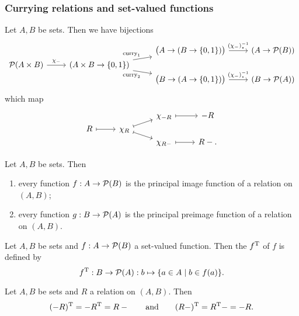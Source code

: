 \subsubsection{Currying relations and set-valued functions}

\begin{proposition} \label{principalImageEquivalence}
Let $A,B$ be sets. Then we have bijections
\[ \begin{tikzcd}[row sep=0]
{} & {} & \big(A\to (B\to \{0,1\}) \big) \ar[r, "{(\charFunc{-})^{-1}_\star}"] & (A\to \powerset(B)) \\
\powerset(A\times B) \ar[r, "{\charFunc{-}}"] & (A\times B \to \{0,1\}) \ar[ur, "\curry_1"] \ar[dr, swap, "\curry_2"] & {} & {} \\
{} & {} & \big(B\to (A\to \{0,1\}) \big) \ar[r, "{(\charFunc{-})^{-1}_\star}"] & (B\to \powerset(A))
\end{tikzcd} \]
which map
\[ \begin{tikzcd}[row sep=0]
{} & {} & \charFunc{-R} \ar[r, mapsto] & -R \\
R \ar[r, mapsto] & \charFunc{R} \ar[ur, mapsto] \ar[dr, mapsto] & {} & {} \\
{} & {} & \charFunc{R-} \ar[r, mapsto] & R-.
\end{tikzcd} \]
\end{proposition}
\begin{corollary}
Let $A,B$ be sets. Then
\begin{enumerate}
\item every function $f: A\to \operatorname{\mathcal{P}}(B)$ is the principal image function of a relation on $(A,B)$;
\item every function $g: B\to \operatorname{\mathcal{P}}(A)$ is the principal preimage function of a relation on $(A,B)$.
\end{enumerate}
\end{corollary}

\begin{definition}
Let $A,B$ be sets and $f: A\to \operatorname{\mathcal{P}}(B)$ a set-valued function. Then the  $f^{\mathrm{T}}$ of $f$ is defined by
\[ f^\transp: B\to \powerset(A): b\mapsto \setbuilder{a\in A}{b\in f(a)}. \]
\end{definition}

\begin{lemma}
Let $A,B$ be sets and $R$ a relation on $(A,B)$. Then
\[ (-R)^{\mathrm{T}} = -R^{\mathrm{T}} = R- \qquad\text{and}\qquad (R-)^{\mathrm{T}} = R^{\mathrm{T}} - = -R. \]
\end{lemma}

